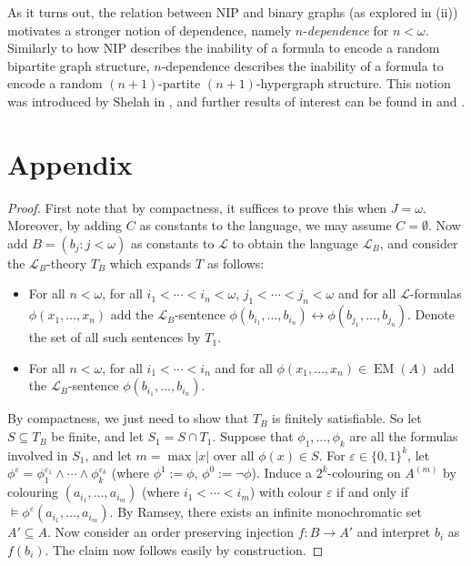\documentclass[a4paper]{report}
\newcommand{\ind}{\hspace{15pt}}
\renewcommand{\L}{\mathcal{L}}
\newcommand{\siff}{\leftrightarrow}
\DeclareMathOperator{\EM}{EM}
\theoremstyle{definition}
\theoremstyle{remstyle}
\newcommand{\uchapter}[1]{%
	\chapter*{#1}%
	\markboth{#1}{}%
	\addcontentsline{toc}{chapter}{#1}%
}
\begin{document}
\ind As it turns out, the relation between NIP and binary graphs (as explored in  (ii)) motivates a stronger notion of dependence, namely $n$-\emph{dependence} for $n<\omega$.  Similarly to how NIP describes the inability of a formula to encode a random bipartite graph structure, $n$-dependence describes the inability of a formula to encode a random $(n + 1)$-partite $(n + 1)$-hypergraph structure. This notion was introduced by Shelah in \cite{strong dep}, and further results of interest can be found in \cite{n dep} and \cite{n dep 2}.



\newpage

\uchapter{Appendix}


\indramsey*

\begin{proof}[Proof]
	First note that by compactness, it suffices to prove this when $J=\omega$. Moreover, by adding $C$ as constants to the language, we may assume $C=\emptyset$. Now add $B=(b_j:j<\omega)$ as constants to $\L$ to obtain the language $\L_B$, and consider the $\L_B$-theory $T_B$ which expands $T$ as follows:
	\begin{itemize}
		\item For all $n<\omega$, for all $i_1<\cdots<i_n<\omega$, $j_1<\cdots<j_n<\omega$ and for all $\L$-formulas $\phi(x_1,\ldots,x_n)$ add the $\L_B$-sentence $\phi(b_{i_1},\ldots,b_{i_n})\siff\phi(b_{j_1},\ldots,b_{j_n})$. Denote the set of all such sentences by $T_1$.
		\item For all $n<\omega$, for all $i_1<\cdots<i_n$ and for all $\phi(x_1,\ldots,x_n)\in\EM(A)$ add the $\L_B$-sentence $\phi(b_{i_1},\ldots,b_{i_n})$.
	\end{itemize}
	By compactness, we just need to show that $T_B$ is finitely satisfiable. So let $S\subseteq T_B$ be finite, and let $S_1=S\cap T_1$. Suppose that $\phi_1,\ldots,\phi_k$ are all the formulas involved in $S_1$, and let $m=\max|x|$ over all $\phi(x)\in S$. For $\varepsilon\in\{0,1\}^k$, let $\phi^\varepsilon=\phi_1^{\varepsilon_1}\wedge\cdots\wedge\phi_k^{\varepsilon_k}$ (where $\phi^1:=\phi$, $\phi^0:=\neg\phi$). Induce a $2^k$-colouring on $A^{(m)}$ by colouring $(a_{i_1},\ldots,a_{i_m})$ (where $i_1<\cdots<i_m$) with colour $\varepsilon$ if and only if $\models\phi^\varepsilon(a_{i_1},\ldots,a_{i_m})$. By Ramsey, there exists an infinite monochromatic set $A'\subseteq A$. Now consider an order preserving injection $f:B\to A'$ and interpret $b_i$ as $f(b_i)$. The claim now follows easily by construction.
\end{proof}
\end{document}
